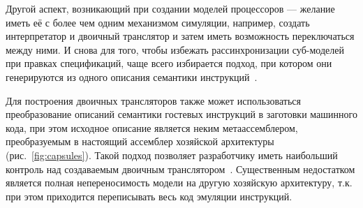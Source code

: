 Другой аспект, возникающий при создании моделей процессоров --- желание иметь её с более чем одним механизмом симуляции, например, создать интерпретатор и двоичный транслятор и затем иметь возможность переключаться между ними. И снова для того, чтобы избежать рассинхронизации суб-моделей при правках спецификаций, чаще всего избирается подход,  при котором они генерируются из одного описания семантики инструкций~\cite{simgen, sled1997}.

Для построения двоичных трансляторов также может использоваться преобразование описаний семантики гостевых инструкций в заготовки машинного кода, при этом исходное описание является неким метаассемблером, преобразуемым в настоящий ассемблер хозяйской архитектуры (рис.~\ref{fig:capsules}). Такой подход позволяет разработчику иметь наибольший контроль над создаваемым двоичным транслятором~\cite{MyConfMIPT52}. Существенным недостатком является полная непереносимость модели на другую хозяйскую архитектуру, т.к. при этом приходится переписывать весь код эмуляции инструкций.

